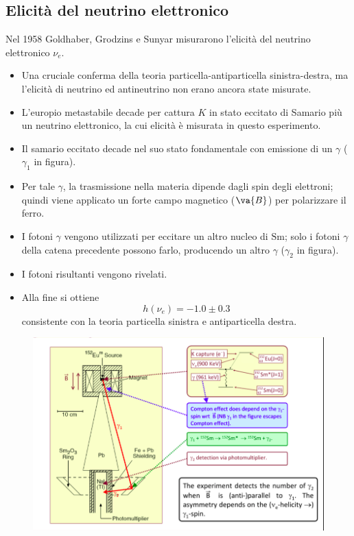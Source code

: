 \subsection{Elicità del neutrino elettronico}
Nel 1958 Goldhaber, Grodzins e Sunyar misurarono l'elicità del neutrino elettronico \(\nu_e\).
\begin{itemize}
    \item Una cruciale conferma della teoria particella-antiparticella sinistra-destra, ma l'elicità di neutrino ed antineutrino non erano ancora state misurate.
    \item L'europio metastabile decade per cattura $K$ in stato eccitato di Samario più un neutrino elettronico, la cui elicità è misurata in questo esperimento.
    \item Il samario eccitato decade nel suo stato fondamentale con emissione di un $\gamma$ ($\gamma_1$ in figura).
    \item Per tale \(\gamma\), la trasmissione nella materia dipende dagli spin degli elettroni; quindi viene applicato un forte campo magnetico (\(\va{B}\)) per polarizzare il ferro.  
    \item I fotoni \(\gamma\) vengono utilizzati per eccitare un altro nucleo di \(\text{Sm}\); solo i fotoni \(\gamma\) della catena precedente possono farlo, producendo un altro \(\gamma\) ($\gamma_2$ in figura).
    \item I fotoni risultanti vengono rivelati.
    \item Alla fine si ottiene 
    \begin{equation*}
    h(\nu_e)=-1.0\pm0.3
    \end{equation*}
    consistente con la teoria particella sinistra e antiparticella destra.
\end{itemize}
\begin{figure}[H]
    \centering
    \includegraphics[width=\textwidth]{immagini/fig_exp_nu_hel.png}
\end{figure}
